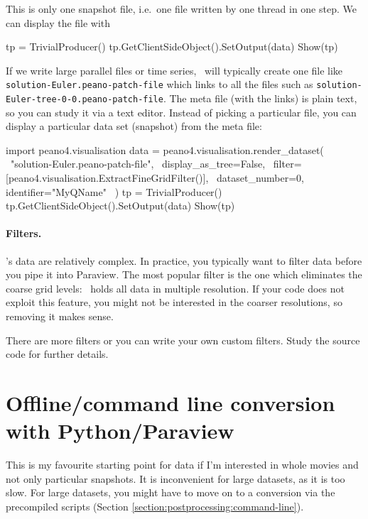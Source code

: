 \noindent
This is only one snapshot file, i.e.~one file written by one thread in one step. 
We can display the file with
\begin{code}
tp = TrivialProducer()
tp.GetClientSideObject().SetOutput(data)
Show(tp)
\end{code}


\noindent
If we write large parallel files or time series, \Peano\ will typically 
create one file like \texttt{solution-Euler.peano-patch-file} which links
to all the files such as \linebreak \texttt{solution-Euler-tree-0-0.peano-patch-file}.
The meta file (with the links) is plain text, so you can study it via a 
text editor.
Instead of picking a particular file, 
you can display a particular data set (snapshot) from the meta file:
\begin{code}
import peano4.visualisation  
data = peano4.visualisation.render_dataset( \
  "solution-Euler.peano-patch-file", \
  display_as_tree=False, \
  filter=[peano4.visualisation.ExtractFineGridFilter()], \
  dataset_number=0, identifier="MyQName" \
)
tp = TrivialProducer()
tp.GetClientSideObject().SetOutput(data)
Show(tp)
\end{code}


\paragraph{Filters.}
%
%
%
\Peano's data are relatively complex.
In practice, you typically want to filter data before you pipe it into Paraview.
The most popular filter is the one which eliminates the coarse grid levels:
\Peano\ holds all data in multiple resolution.
If your code does not exploit this feature, you might not be interested in the 
coarser resolutions, so removing it makes sense.


There are more filters or you can write your own custom filters.
Study the source code for further details.



\section{Offline/command line conversion with Python/Paraview}
\label{label:postprocessing:convert-with-paraview}

\begin{remark}
 This is my favourite starting point for data if I'm interested in whole movies
 and not only particular snapshots. It is inconvenient for large datasets, as 
 it is too slow. For large datasets, you might have to move on to a conversion
 via the precompiled scripts (Section
 \ref{section:postprocessing:command-line}).
\end{remark}


